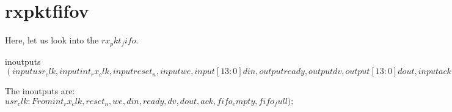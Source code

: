 \chapter{rxpktfifov}

Here, let us look into the $rx_pkt_fifo$.

\begin{chunk}{inoutputs}
$
(input usr_clk,
 input int_rx_clk,
 input reset_n,

 input we,
 input [13:0] din,
 output ready,
 output dv,
 output [13:0] dout,
 input ack,
 output fifo_empty,
 output fifo_full);
$
\end{chunk}

The inoutputs are:
$
usr_clk: From 
int_rx_clk,
reset_n,

we,
din,
ready,
dv,
dout,
ack,
fifo_empty,
fifo_full);
$
